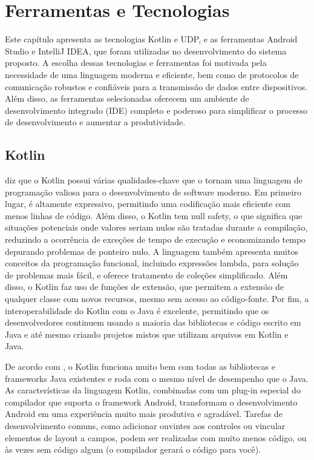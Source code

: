 \documentclass[12pt]{article}
\begin{document}
\section{Ferramentas e Tecnologias}
\label{sec:ferramentastecnologias}
Este capítulo apresenta as tecnologias Kotlin e UDP, e as ferramentas Android Studio e IntelliJ IDEA, que foram utilizadas no desenvolvimento do sistema proposto. A escolha dessas tecnologias e ferramentas foi motivada pela necessidade de uma linguagem moderna e eficiente, bem como de protocolos de comunicação robustos e confiáveis para a transmissão de dados entre dispositivos. Além disso, as ferramentas selecionadas oferecem um ambiente de desenvolvimento integrado (IDE) completo e poderoso para simplificar o processo de desenvolvimento e aumentar a produtividade.
\subsection{Kotlin}

\cite{leiva2019kotlin} diz que o Kotlin possui várias qualidades-chave que o tornam uma linguagem de programação valiosa para o desenvolvimento de software moderno. Em primeiro lugar, é altamente expressivo, permitindo uma codificação mais eficiente com menos linhas de código. Além disso, o Kotlin tem null safety, o que significa que situações potenciais onde valores seriam nulos são tratadas durante a compilação, reduzindo a ocorrência de exceções de tempo de execução e economizando tempo depurando problemas de ponteiro nulo. A linguagem também apresenta muitos conceitos da programação funcional, incluindo expressões lambda, para solução de problemas mais fácil, e oferece tratamento de coleções simplificado. Além disso, o Kotlin faz uso de funções de extensão, que permitem a extensão de qualquer classe com novos recursos, mesmo sem acesso ao código-fonte. Por fim, a interoperabilidade do Kotlin com o Java é excelente, permitindo que os desenvolvedores continuem usando a maioria das bibliotecas e código escrito em Java e até mesmo criando projetos mistos que utilizam arquivos em Kotlin e Java.


De acordo com \cite{jemerov2017kotlin}, o Kotlin funciona muito bem com todas as bibliotecas e frameworks Java existentes e roda com o mesmo nível de desempenho que o Java. As características da linguagem Kotlin, combinadas com um plug-in especial do compilador que suporta o framework Android, transformam o desenvolvimento Android em uma experiência muito mais produtiva e agradável. Tarefas de desenvolvimento comuns, como adicionar ouvintes aos controles ou vincular elementos de layout a campos, podem ser realizadas com muito menos código, ou às vezes sem código algum (o compilador gerará o código para você).
\end{document}
